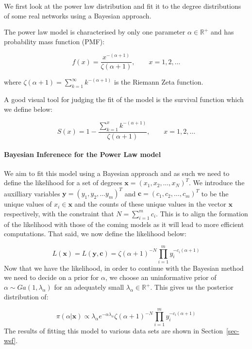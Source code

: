 \documentclass[
]{article}
\let\oldparagraph\paragraph
\renewcommand{\paragraph}[1]{\oldparagraph{#1}\mbox{}}
\begin{document}
We first look at the power law distribution and fit it to the degree
distributions of some real networks using a Bayesian approach.

The power law model is characterised by only one parameter
\(\alpha\in\mathbb{R}^+\) and has probability mass function (PMF):

\[
f(x) = \frac{x^{-(\alpha+1)}}{\zeta(\alpha+1)}, \qquad x=1,2,\ldots
\]

where \(\zeta(\alpha+1) = \sum_{k=1}^\infty k^{-(\alpha+1)}\) is the
Riemann Zeta function.

A good visual tool for judging the fit of the model is the survival
function which we define below:

\[
S(x) = 1 - \frac{\sum_{k=1}^x k^{-(\alpha+1)}}{\zeta(\alpha+1)}, \qquad x=1,2,\ldots
\]

\paragraph{Bayesian Inferenece for the Power Law
model}\label{bayesian-inferenece-for-the-power-law-model}

We aim to fit this model using a Bayesian approach and as such we need
to define the likelihood for a set of degrees
\(\boldsymbol{x} = (x_1, x_2, \ldots, x_N)^T\). We introduce the
auxilliary variables \(\boldsymbol{y} = (y_1, y_2, \ldots y_m)^T\) and
\(\boldsymbol{c} = (c_1, c_2, \ldots,c_m)^T\) to be the unique values of
\(x_i \in \boldsymbol{x}\) and the counts of these unique values in the
vector \(\boldsymbol{x}\) respectively, with the constraint that
\(N = \sum_{i=1}^m c_i\). This is to align the formation of the
likelihood with those of the coming models as it will lead to more
efficient computations. That said, we now define the likelihood below:

\[
L(\boldsymbol{x}) = L(\boldsymbol{y},\boldsymbol{c}) =  \zeta(\alpha+1)^{-N}\prod_{i=1}^m y_i^{-c_i(\alpha+1)}
\] Now that we have the likelihood, in order to continue with the
Bayesian method we need to decide on a prior for \(\alpha\), we choose
an uninformative prior of \(\alpha\sim Ga(1,\lambda_\alpha)\) for an
adequately small \(\lambda_\alpha\in\mathbb{R^+}\). This gives us the
posterior distribution of:

\[
\pi(\alpha|\boldsymbol{x}) \propto \lambda_\alpha e^{-\alpha\lambda_\alpha}\zeta(\alpha+1)^{-N}\prod_{i=1}^m y_i^{-c_i(\alpha+1)}
\] The results of fitting this model to various data sets are shown in
Section~\ref{sec-wsf}.
\end{document}
